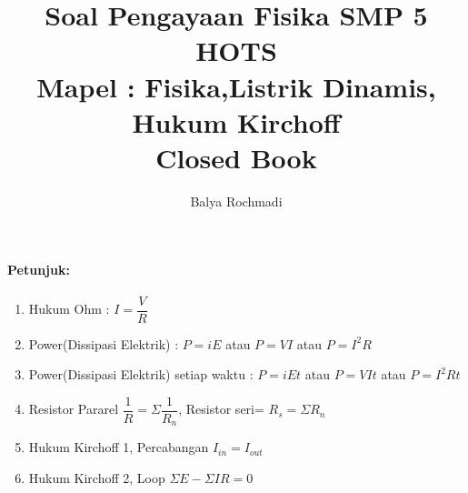 \documentclass[12pt,a4paper,draft,final,oneside,twoside,openright,openany]{article}
\author{Balya Rochmadi}
\title{Soal Pengayaan Fisika SMP 5 HOTS\\Mapel : Fisika,Listrik Dinamis, Hukum Kirchoff\\Closed Book}
\begin{document}
	\maketitle
	\Large
	\noindent\makebox[\linewidth]{\rule{\paperwidth}{0.4pt}}

	\paragraph{Petunjuk: }
				\begin{enumerate}
					\item Hukum Ohm : $I=\dfrac{V}{R}$
					\item Power(Dissipasi Elektrik) : $P=iE$ atau $P=VI$ atau $P=I^2R$
					\item Power(Dissipasi Elektrik) setiap waktu : $P=iEt$ atau $P=VIt$ atau $P=I^2Rt$
					\item Resistor Pararel $\dfrac{1}{R}=\Sigma \dfrac{1}{R_n}$, Resistor seri= $R_s=\Sigma R_n$
					\item Hukum Kirchoff 1, Percabangan $I_{in}=I_{out}$
					\item Hukum Kirchoff 2, Loop $\Sigma E -\Sigma IR= 0$
				\end{enumerate}

	
		
	\noindent\makebox[\linewidth]{\rule{\paperwidth}{0.4pt}}
	
	
		
\end{document}
